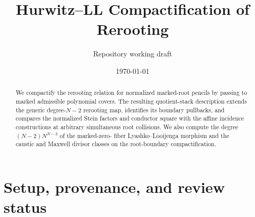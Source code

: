\documentclass[11pt]{article}
\title{Hurwitz--LL Compactification of Rerooting}
\author{Repository working draft}
\date{\today}
\begin{document}
\maketitle

\begin{abstract}
We compactify the rerooting relation for normalized marked-root pencils by
passing to marked admissible polynomial covers.  The resulting quotient-stack
description extends the generic degree-$N-2$ rerooting map, identifies its
boundary pullbacks, and compares the normalized Stein factors and conductor
square with the affine incidence constructions at arbitrary simultaneous root
collisions.  We also compute the degree $(N-2)N^{N-3}$ of the marked-zero-
fiber Lyashko--Looijenga morphism and the caustic and Maxwell divisor classes
on the root-boundary compactification.
\end{abstract}

\section{Setup, provenance, and review status}
\end{document}
